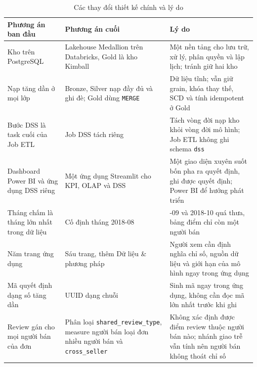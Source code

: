 \documentclass[a4paper]{article}
\begin{document}
\begin{table}[htbp]
\centering
\footnotesize
\setlength{\tabcolsep}{3pt}
\renewcommand{\arraystretch}{1.1}
\caption{Các thay đổi thiết kế chính và lý do}
\label{tab:pl_changes}
\begin{tabularx}{\textwidth}{@{}>{\raggedright\arraybackslash}p{3.6cm}>{\raggedright\arraybackslash}p{4.0cm}>{\raggedright\arraybackslash}X@{}}
\toprule
\textbf{Phương án ban đầu} & \textbf{Phương án cuối} & \textbf{Lý do} \\
\midrule
Kho trên PostgreSQL & Lakehouse Medallion trên Databricks, Gold là kho Kimball & Một nền tảng cho lưu trữ, xử lý, phân quyền và lập lịch; tránh giữ hai kho \\
\addlinespace
Nạp tăng dần ở mọi lớp & Bronze, Silver nạp đầy đủ và ghi đè; Gold dùng \texttt{MERGE} & Dữ liệu tĩnh; vẫn giữ grain, khóa thay thế, SCD và tính idempotent ở Gold \\
\addlinespace
Bước DSS là task cuối của Job ETL & Job DSS tách riêng & Tách vòng đời nạp kho khỏi vòng đời mô hình; Job ETL không ghi schema \texttt{dss} \\
\addlinespace
Dashboard Power BI và ứng dụng DSS riêng & Một ứng dụng Streamlit cho KPI, OLAP và DSS & Một giao diện xuyên suốt bốn pha ra quyết định, ghi được quyết định; Power BI để hướng phát triển \\
\addlinespace
Tháng chấm là tháng lớn nhất trong dữ liệu & Cố định tháng 2018-08 & 2018-09 và 2018-10 quá thưa, bảng điểm chỉ còn một người bán \\
\addlinespace
Năm trang ứng dụng & Sáu trang, thêm Dữ liệu \& phương pháp & Người xem cần định nghĩa chỉ số, nguồn dữ liệu và giới hạn của mô hình ngay trong ứng dụng \\
\addlinespace
Mã quyết định dạng số tăng dần & UUID dạng chuỗi & Sinh mã ngay trong ứng dụng, không cần đọc mã lớn nhất trước khi ghi \\
\addlinespace
Review gán cho mọi người bán của đơn & Phân loại \texttt{shared\_\allowbreak{}review\_\allowbreak{}type}, measure người bán loại đơn nhiều người bán và \texttt{cross\_\allowbreak{}seller} & Không xác định được điểm review thuộc người bán nào; nhánh giao trễ vẫn tính nên người bán không thoát chỉ số \\
\bottomrule
\end{tabularx}
\end{table}
\end{document}
